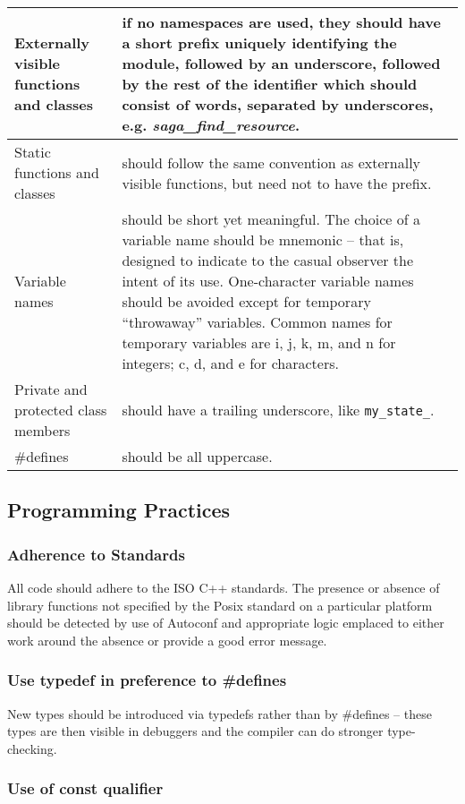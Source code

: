 \documentclass{article}
\newcommand{\T}{\texttt}
\begin{document}
\begin{tabular}{|l|p{42ex}|}
\hline
  Externally visible functions and classes
& 
  if no namespaces are used, they should have a short prefix uniquely
  identifying the module, followed by an underscore, followed by the
  rest of the identifier which should consist of words, separated by
  underscores, e.g. \emph{saga\_find\_resource}.
\tabularnewline
\hline
  Static functions and classes
&
  should follow the same convention as externally visible functions,
  but need not to have the prefix.
\tabularnewline
\hline
  Variable names 
&   
  should be short yet meaningful. The choice of a variable name should
  be mnemonic -- that is, designed to indicate to the casual observer
  the intent of its use.  One-character variable names should be
  avoided except for temporary ``throwaway'' variables. Common names
  for temporary variables are i, j, k, m, and n for integers; c, d,
  and e for characters. 
\tabularnewline
\hline
  Private and protected class members
&   
  should have a trailing underscore, like \T{my\_state\_}.
\tabularnewline
\hline
  \#defines
&
  should be all uppercase.
\tabularnewline
\hline
\end{tabular}

\subsection{Programming Practices}

\subsubsection{Adherence to Standards}

All code should adhere to the ISO C++ standards.
The presence or absence of library functions not specified by the
Posix standard on a particular platform should be detected by use of
Autoconf and appropriate logic emplaced to either work around the
absence or provide a good error message.

\subsubsection{Use typedef in preference to \#defines}

New types should be introduced via typedefs rather than by \#defines
-- these types are then visible in debuggers and the compiler can do
stronger type-checking.

\subsubsection{Use of const qualifier}
\end{document}
